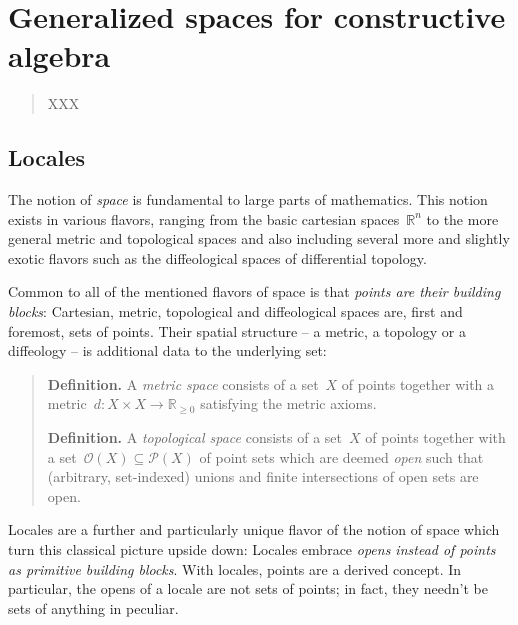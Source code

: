 \documentclass{ws-rv9x6}
\renewcommand{\O}{\mathcal{O}}
\newcommand{\RR}{\mathbb{R}}
\renewcommand{\P}{\mathcal{P}}
\renewcommand{\_}{\mathpunct{.}}
\newcommand{\?}{\,{:}\,}
\begin{document}
\chapter{Generalized spaces for constructive algebra}

\author[I. Blechschmidt]{Ingo Blechschmidt}

\address{Universität Augsburg \\
Institut für Mathematik \\
Universitätsstr. 14 \\
86159 Augsburg, Germany}

\begin{abstract}
XXX
\end{abstract}
\body

\tableofcontents

\section{Locales}

The notion of \emph{space} is fundamental to large parts of mathematics. This notion
exists in various flavors, ranging from the basic cartesian spaces~$\RR^n$ to
the more general metric and topological spaces and also including several more
and slightly exotic flavors such as the diffeological spaces of differential topology.

Common to all of the mentioned flavors of space is that \emph{points are their
building blocks}: Cartesian, metric, topological and diffeological spaces are,
first and foremost, sets of points. Their spatial structure -- a metric, a
topology or a diffeology -- is additional data to the underlying set:

\begin{quote}
\textbf{Definition.} A \emph{metric space} consists of a set~$X$ of points
together with a metric~$d : X \times X \to \RR_{\geq 0}$ satisfying the metric
axioms.

\textbf{Definition.} A \emph{topological space} consists of a set~$X$ of points
together with a set~$\O(X) \subseteq \P(X)$ of point sets which are deemed
\emph{open} such that (arbitrary, set-indexed) unions and finite intersections
of open sets are open.
\end{quote}

Locales are a further and particularly unique flavor of the notion of space
which turn this classical picture upside down: Locales embrace \emph{opens
instead of points as primitive building blocks}. With locales, points are a
derived concept. In particular, the opens of a locale are not sets of points;
in fact, they needn't be sets of anything in peculiar.
\end{document}

